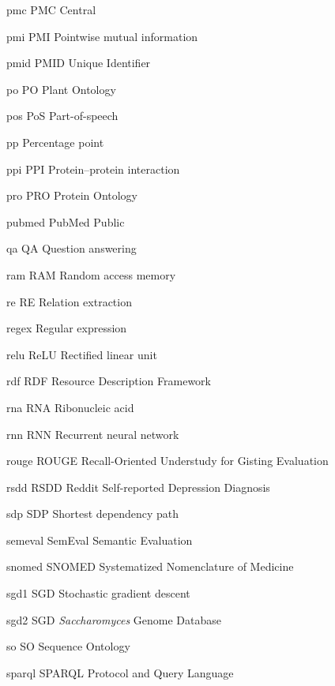 \newabbreviation
{pmc}
{PMC}
{ Central}

\newabbreviation
{pmi}
{PMI}
{Pointwise mutual information}

\newabbreviation
{pmid}
{PMID}
{ Unique Identifier}

\newabbreviation
{po}
{PO}
{Plant Ontology}

\newabbreviation
{pos}
{PoS}
{Part-of-speech}

{pp}
{Percentage point}

\newabbreviation
{ppi}
{PPI}
{Protein--protein interaction}

\newabbreviation
{pro}
{PRO}
{Protein Ontology}

\newabbreviation
{pubmed}
{PubMed}
{Public }

\newabbreviation
{qa}
{QA}
{Question answering}

\newabbreviation
{ram}
{RAM}
{Random access memory}

\newabbreviation
{re}
{RE}
{Relation extraction}

{regex}
{Regular expression}

\newabbreviation
{relu}
{ReLU}
{Rectified linear unit}

\newabbreviation
{rdf}
{RDF}
{Resource Description Framework}

\newabbreviation
{rna}
{RNA}
{Ribonucleic acid}

\newabbreviation
{rnn}
{RNN}
{Recurrent neural network}

\newabbreviation
{rouge}
{ROUGE}
{Recall-Oriented Understudy for Gisting Evaluation}

\newabbreviation
{rsdd}
{RSDD}
{Reddit Self-reported Depression Diagnosis}

\newabbreviation
{sdp}
{SDP}
{Shortest dependency path}

\newabbreviation
{semeval}
{SemEval}
{Semantic Evaluation}

\newabbreviation
{snomed}
{SNOMED}
{Systematized Nomenclature of Medicine}

\newabbreviation
{sgd1}
{SGD}
{Stochastic gradient descent}

\newabbreviation
{sgd2}
{SGD}
{\textit{Saccharomyces} Genome Database}

\newabbreviation
{so}
{SO}
{Sequence Ontology}

\newabbreviation
{sparql}
{SPARQL}
{ Protocol and  Query Language}

